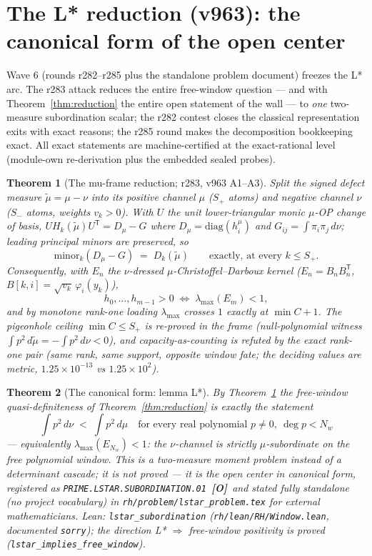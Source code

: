 \documentclass[11pt]{article}
\newcommand{\mO}{\textcolor{openred}{\textbf{[O]}}}
\newtheorem{theorem}{Theorem}[section]
\theoremstyle{definition}
\theoremstyle{remark}
\begin{document}
\section{The L* reduction (v963): the canonical form of the open
center}\label{sec:lstar}

Wave 6 (rounds r282--r285 plus the standalone problem document)
freezes the L* arc.  The r283 attack reduces the entire free-window
question --- and with Theorem~\ref{thm:reduction} the entire open
statement of the wall --- to \emph{one} two-measure subordination
scalar; the r282 contest closes the classical representation exits
with exact reasons; the r285 round makes the decomposition bookkeeping
exact.  All exact statements are machine-certified at the
exact-rational level (module-own re-derivation plus the embedded
sealed probes).

\begin{theorem}[The mu-frame reduction; r283, v963 A1--A3]
\label{thm:frame}
Split the signed defect measure $\tilde\mu=\mu-\nu$ into its positive
channel $\mu$ ($S_+$ atoms) and negative channel $\nu$ ($S_-$ atoms,
weights $v_k>0$).  With $U$ the unit lower-triangular monic $\mu$-OP
change of basis, $U H_k(\tilde\mu)U^{\mathsf T}=D_\mu-G$ where
$D_\mu=\mathrm{diag}(h^\mu_i)$ and $G_{ij}=\int\pi_i\pi_j\,d\nu$;
leading principal minors are preserved, so
\[
\mathrm{minor}_k(D_\mu-G)\;=\;D_k(\tilde\mu)
\qquad\text{exactly, at every }k\le S_+ .
\]
Consequently, with $E_n$ the $\nu$-dressed $\mu$-Christoffel--Darboux
kernel ($E_n=B_nB_n^{\mathsf T}$, $B[k,i]=\sqrt{v_k}\,\varphi_i(y_k)$),
\[
h_0,\dots,h_{m-1}>0
\;\Longleftrightarrow\;
\lambda_{\max}(E_m)<1 ,
\]
and by monotone rank-one loading $\lambda_{\max}$ crosses $1$
\emph{exactly} at $\min C+1$.  The pigeonhole ceiling $\min C\le S_+$
is re-proved in the frame (null-polynomial witness
$\int p^2\,d\tilde\mu=-\int p^2\,d\nu<0$), and capacity-as-counting is
refuted by the exact rank-one pair (same rank, same support, opposite
window fate; the deciding values are metric,
$1.25\times10^{-13}$ vs $1.25\times10^{2}$).
\end{theorem}

\begin{theorem}[The canonical form: lemma L*]\label{thm:lstar}
By Theorem~\ref{thm:frame} the free-window quasi-definiteness of
Theorem~\ref{thm:reduction} is exactly the statement
\[
\boxed{\;\int p^2\,d\nu\;<\;\int p^2\,d\mu
\quad\text{for every real polynomial }p\ne0,\ \deg p<N_w\;}
\]
--- equivalently $\lambda_{\max}(E_{N_w})<1$: the $\nu$-channel is
strictly $\mu$-subordinate on the free polynomial window.  This is a
two-measure moment problem instead of a determinant cascade; \emph{it
is not proved} --- it is the open center in canonical form, registered
as \texttt{PRIME.LSTAR.SUBORDINATION.01}~\mO\ and stated fully
standalone (no project vocabulary) in
\texttt{rh/problem/lstar\_problem.tex} for external mathematicians.
Lean: \texttt{lstar\_subordination}
(\texttt{rh/lean/RH/Window.lean}, documented \texttt{sorry}); the
direction L* $\Rightarrow$ free-window positivity is \emph{proved}
(\texttt{lstar\_implies\_free\_window}).
\end{theorem}
\end{document}

